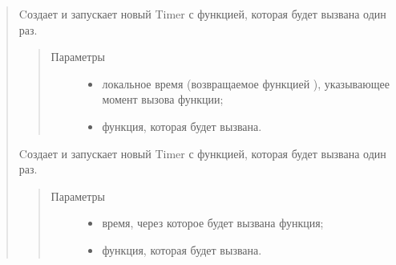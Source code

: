 \documentclass[a4paper,10pt,russian]{sphinxmanual}
\begin{document}
\begin{quote}
\begin{fulllineitems}
\begin{fulllineitems}
\end{fulllineitems}


\begin{fulllineitems}
\label{\detokenize{programming/lua/lua:Timer.callAt}}
Cоздает и запускает новый Timer с функцией, которая будет вызвана один раз.
\begin{quote}\begin{description}
\item[{Параметры}] \leavevmode\begin{itemize}
\item {} 
 \textendash{} локальное время (возвращаемое функцией {\hyperref[\detokenize{programming/lua/lua:time}]{}}), указывающее момент вызова функции;

\item {} 
 \textendash{} функция, которая будет вызвана.

\end{itemize}

\end{description}\end{quote}

\end{fulllineitems}


\begin{fulllineitems}
\label{\detokenize{programming/lua/lua:Timer.callLater}}
Cоздает и запускает новый Timer с функцией, которая будет вызвана один раз.
\begin{quote}\begin{description}
\item[{Параметры}] \leavevmode\begin{itemize}
\item {} 
 \textendash{} время, через которое будет вызвана функция;

\item {} 
 \textendash{} функция, которая будет вызвана.

\end{itemize}


\end{description}
\end{quote}
\end{fulllineitems}
\end{fulllineitems}
\end{quote}
\end{document}
